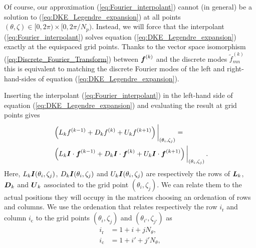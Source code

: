 \documentclass[10pt]{iopart}
\begin{document}
 Of course, our approximation (\ref{eq:Fourier_interpolant}) cannot (in general) be a solution to (\ref{eq:DKE_Legendre_expansion}) at all points $(\theta,\zeta)\in[0,2\pi)\times[0,2\pi/N_p)$. Instead, we will force that the interpolant (\ref{eq:Fourier_interpolant}) solves equation (\ref{eq:DKE_Legendre_expansion}) exactly at the equispaced grid points. Thanks to the vector space isomorphism (\ref{eq:Discrete_Fourier_Transform}) between $\vb*{f}^{(k)}$ and the discrete modes $\tilde{f}_{mn}^{(k)}$ this is equivalent to matching the discrete Fourier modes of the left and right-hand-sides of equation (\ref{eq:DKE_Legendre_expansion}).
 
 Inserting the interpolant (\ref{eq:Fourier_interpolant}) in the left-hand side of equation (\ref{eq:DKE_Legendre_expansion}) and evaluating the result at grid points gives
 \begin{align}
 	& 
 	\eval{\left(
 		L_k f^{(k-1)} 
 		+
 		D_k f^{(k)}
 		+
 		U_k f^{(k+1)}
 		\right)}_{(\theta_i,\zeta_j)}
 	=
 	\nonumber
 	\\
 	& 
 	\eval{\left(
 		L_k \vb*{I} \cdot \vb*{f}^{(k-1)} 
 		+
 		D_k \vb*{I} \cdot \vb*{f}^{(k)}
 		+
 		U_k \vb*{I} \cdot \vb*{f}^{(k+1)}
 		\right)}_{(\theta_i,\zeta_j)}.
 \end{align}
 Here, $L_k \vb*{I}(\theta_i,\zeta_j)$, $D_k \vb*{I}(\theta_i,\zeta_j)$ and $U_k \vb*{I}(\theta_i,\zeta_j)$ are respectively the rows of $\vb*{L}_k$, $\vb*{D}_k$ and $\vb*{U}_k$ associated to the grid point $(\theta_i,\zeta_j)$. We can relate them to the actual positions they will occupy in the matrices choosing an ordenation of rows and columns. We use the ordenation that relates respectively the row $i_{\text{r}}$ and column $i_{\text{c}}$ to the grid points $(\theta_i,\zeta_j)$ and $(\theta_{i'},\zeta_{j'})$ as
 \begin{align}
 	i_{\text{r}} & = 1 + i + j N_\theta,  \label{eq:Row_ordenation}\\ 
 	i_{\text{c}} & = 1 + i' + j' N_\theta, \label{eq:Column_ordenation}
 \end{align}
\end{document}
